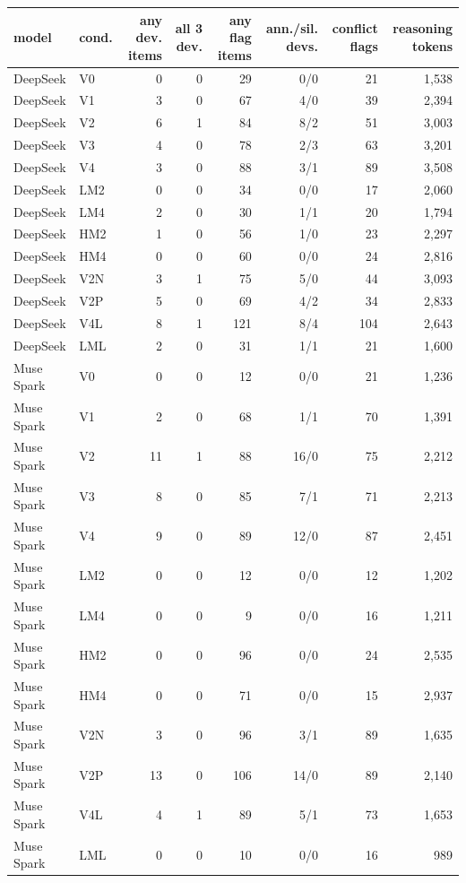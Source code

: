 \begin{tabular}{llrrrrrr}
\toprule
model & cond. & any dev. items & all 3 dev. & any flag items & ann./sil. devs. & conflict flags & reasoning tokens \\
\midrule
DeepSeek & V0 & 0 & 0 & 29 & 0/0 & 21 & 1,538 \\
DeepSeek & V1 & 3 & 0 & 67 & 4/0 & 39 & 2,394 \\
DeepSeek & V2 & 6 & 1 & 84 & 8/2 & 51 & 3,003 \\
DeepSeek & V3 & 4 & 0 & 78 & 2/3 & 63 & 3,201 \\
DeepSeek & V4 & 3 & 0 & 88 & 3/1 & 89 & 3,508 \\
DeepSeek & LM2 & 0 & 0 & 34 & 0/0 & 17 & 2,060 \\
DeepSeek & LM4 & 2 & 0 & 30 & 1/1 & 20 & 1,794 \\
DeepSeek & HM2 & 1 & 0 & 56 & 1/0 & 23 & 2,297 \\
DeepSeek & HM4 & 0 & 0 & 60 & 0/0 & 24 & 2,816 \\
DeepSeek & V2N & 3 & 1 & 75 & 5/0 & 44 & 3,093 \\
DeepSeek & V2P & 5 & 0 & 69 & 4/2 & 34 & 2,833 \\
DeepSeek & V4L & 8 & 1 & 121 & 8/4 & 104 & 2,643 \\
DeepSeek & LML & 2 & 0 & 31 & 1/1 & 21 & 1,600 \\
Muse Spark & V0 & 0 & 0 & 12 & 0/0 & 21 & 1,236 \\
Muse Spark & V1 & 2 & 0 & 68 & 1/1 & 70 & 1,391 \\
Muse Spark & V2 & 11 & 1 & 88 & 16/0 & 75 & 2,212 \\
Muse Spark & V3 & 8 & 0 & 85 & 7/1 & 71 & 2,213 \\
Muse Spark & V4 & 9 & 0 & 89 & 12/0 & 87 & 2,451 \\
Muse Spark & LM2 & 0 & 0 & 12 & 0/0 & 12 & 1,202 \\
Muse Spark & LM4 & 0 & 0 & 9 & 0/0 & 16 & 1,211 \\
Muse Spark & HM2 & 0 & 0 & 96 & 0/0 & 24 & 2,535 \\
Muse Spark & HM4 & 0 & 0 & 71 & 0/0 & 15 & 2,937 \\
Muse Spark & V2N & 3 & 0 & 96 & 3/1 & 89 & 1,635 \\
Muse Spark & V2P & 13 & 0 & 106 & 14/0 & 89 & 2,140 \\
Muse Spark & V4L & 4 & 1 & 89 & 5/1 & 73 & 1,653 \\
Muse Spark & LML & 0 & 0 & 10 & 0/0 & 16 & 989 \\

\end{tabular}
